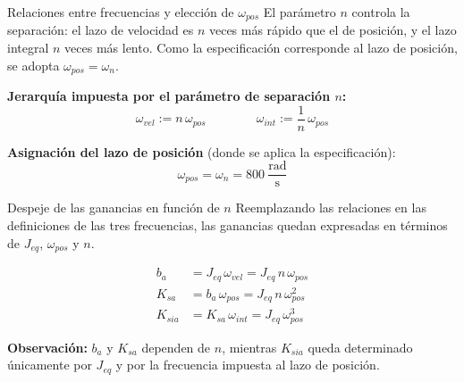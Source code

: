 \documentclass[aspectratio=169,t]{beamer}
\begin{document}
\begin{frame}{Relaciones entre frecuencias y elección de $\omega_{pos}$}
{\small\color{uncGray}El parámetro $n$ controla la separación: el lazo de velocidad es $n$ veces más rápido que el de posición, y el lazo integral $n$ veces más lento. Como la especificación corresponde al lazo de posición, se adopta $\omega_{pos}=\omega_n$.}\par
\vspace{6mm}

\textbf{Jerarquía impuesta por el parámetro de separación $n$:}
\begin{equation*}
\omega_{vel} := n\,\omega_{pos}
\qquad\qquad
\omega_{int} := \frac{1}{n}\,\omega_{pos}
\end{equation*}

\vspace{8mm}
\textbf{Asignación del lazo de posición} (donde se aplica la especificación):
\begin{equation*}
\omega_{pos} = \omega_n = 800~\frac{\text{rad}}{\text{s}}
\end{equation*}
\end{frame}

\begin{frame}{Despeje de las ganancias en función de $n$}
{\small\color{uncGray}Reemplazando las relaciones en las definiciones de las tres frecuencias, las ganancias quedan expresadas en términos de $J_{eq}$, $\omega_{pos}$ y $n$.}\par
\vspace{6mm}

\begin{align*}
b_a   &= J_{eq}\,\omega_{vel} = J_{eq}\,n\,\omega_{pos} \\[4pt]
K_{sa}  &= b_a\,\omega_{pos}  = J_{eq}\,n\,\omega_{pos}^{2} \\[4pt]
K_{sia} &= K_{sa}\,\omega_{int} = J_{eq}\,\omega_{pos}^{3}
\end{align*}

\vspace{6mm}
{\small \textbf{Observación:} $b_a$ y $K_{sa}$ dependen de $n$, mientras $K_{sia}$ queda determinado únicamente por $J_{eq}$ y por la frecuencia impuesta al lazo de posición.}
\end{frame}
\end{document}
